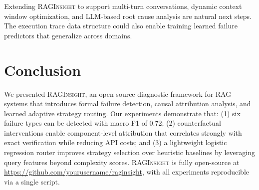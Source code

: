 \documentclass[11pt,a4paper]{article}
\begin{document}
Extending \textsc{RAGInsight} to support multi-turn conversations, dynamic context window optimization, and LLM-based root cause analysis are natural next steps. The execution trace data structure could also enable training learned failure predictors that generalize across domains.

\section{Conclusion}

We presented \textsc{RAGInsight}, an open-source diagnostic framework for RAG systems that introduces formal failure detection, causal attribution analysis, and learned adaptive strategy routing. Our experiments demonstrate that: (1) six failure types can be detected with macro F1 of 0.72; (2) counterfactual interventions enable component-level attribution that correlates strongly with exact verification while reducing API costs; and (3) a lightweight logistic regression router improves strategy selection over heuristic baselines by leveraging query features beyond complexity scores. \textsc{RAGInsight} is fully open-source at \url{https://github.com/yourusername/raginsight}, with all experiments reproducible via a single script.
\end{document}
